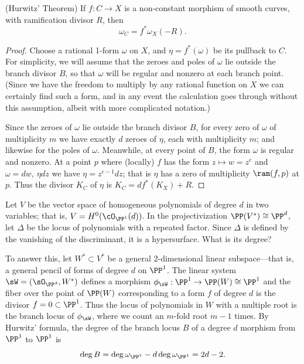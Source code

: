  
\begin{theorem}(Hurwitz' Theorem) \cite[****]{H} \label{Hurwitz}
If $f:C\to X$ is a non-constant morphism of smooth curves, with ramification divisor $R$, then 
$$
\omega_{C} = f^{*}\omega_{X}(-R).
$$
\end{theorem}
 
 
\begin{proof}
Choose a rational 1-form $\omega$ on $X$, and $\eta = f^*(\omega)$ be its pullback to $C$. For simplicity, we will assume that the zeroes and poles of $\omega$ lie outside the branch divisor $B$, so that $\omega$ will be regular and nonzero at each branch point. (Since we have the freedom to multiply by any rational function on $X$ we can certainly find such a form, and in any event the calculation goes through without this assumption, albeit with more complicated notation.) 

Since the zeroes of $\omega$ lie outside the branch divisor $B$, for every zero of $\omega$ of multiplicity $m$ we have exactly $d$ zeroes of $\eta$, each with multiplicity $m$; and likewise for the poles of $\omega$. Meanwhile, at every point of $B$, the form $\omega$ is regular and nonzero. At a point $p$ where (locally) $f$ has the form $z \mapsto w = z^{e}$
and $\omega = dw,\ \eta dz$ we have $\eta = z^{e-1}dz$; that is $\eta$ has a zero of multiplicity $\ram(f,p)$ at  $p$.
Thus the divisor $K_{C}$ of $\eta$ is
$K_{C} = df^{*}(K_{X})+R$.
\end{proof}

\begin{example}
 Let $V$ be the vector space of homogeneous polynomials of degree $d$ in two variables; that is, $V = H^0(\cO_{\PP^1}(d))$. In the projectivization $\PP(V^{*}) \cong \PP^d$, let $\Delta$ be the locus of polynomials with a repeated factor. Since $\Delta$ is defined by the vanishing of the discriminant, it is a hypersurface. What is its degree?
 
 To answer this, let $W^{*}\subset V^{*}$ be a general 2-dimensional linear subspace---that is, a general pencil of forms of degree $d$ on $\PP^1$. The linear system $\sW = (\sO_{\PP^{d}}, W^{*})$ defines a morphism $\phi_{\sW} : \PP^{1} \to \PP(W) \cong \PP^{1}$ and the fiber over the point of $\PP(W)$ corresponding to a form $f$ of degree $d$ is the divisor $f = 0\subset \PP^{1}$. Thus the locus of polynomials in $W$ with a multiple root is the branch locus of $\phi_{\sW}$, where we count an $m$-fold root $m-1$ times.
 By Hurwitz' formula, the degree of the branch locus $B$ of a degree $d$ morphism from $\PP^{1}$ to $\PP^{1}$ is
 $$
 \deg B = \deg \omega_{\PP^{1}} - d\deg \omega_{\PP^{1}} = 2d-2.
 $$
 \end{example}
 
